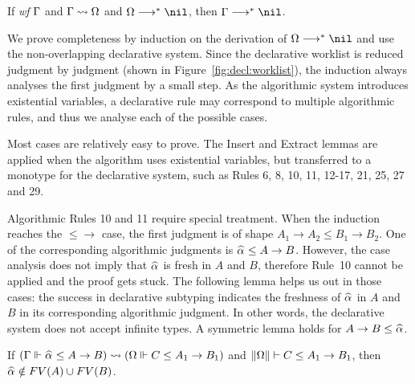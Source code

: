 \begin{theorem}[Completeness]
If \emph{wf }$\Gamma$ and $\Gamma\rightsquigarrow\Omega$ and $\Om\redto\nil$, then $\Gm \redto \nil$.
\label{thm:completeness}
\end{theorem}

We prove completeness by induction on the derivation of $\Om\redto\nil$
and use the non-overlapping declarative system.
Since the declarative worklist is reduced judgment by judgment
(shown in Figure~\ref{fig:decl:worklist}),
the induction always analyses the first judgment by a small step.
As the algorithmic system introduces existential variables,
a declarative rule may correspond to multiple algorithmic rules,
and thus we analyse each of the possible cases.

Most cases are relatively easy to prove.
The Insert and Extract lemmas are applied when the algorithm uses existential variables,
but transferred to a monotype for the declarative system,
such as Rules 6, 8, 10, 11, 12-17, 21, 25, 27 and 29.

Algorithmic Rules 10 and 11 require special treatment.
When the induction reaches the $\mathtt{{\le}{\to}}$ case,
the first judgment is of shape $A_1 \to A_2 \le B_1 \to B_2$.
One of the corresponding algorithmic judgments is $\al \le A \to B$.
However, the case analysis does not imply that $\al$ is fresh in $A$ and $B$,
therefore Rule~10 cannot be applied and the proof gets stuck.
The following lemma helps us out in those cases:
the success in declarative subtyping indicates the freshness of $\al$ in $A$ and $B$
in its corresponding algorithmic judgment.
In other words, the declarative system does not accept infinite types.
A symmetric lemma holds for $A\to B \le \al$.

\begin{lemma}\label{lem:prune_inst}
If $(\Gm \Vdash \al \le A \to B) \sto (\Om \Vdash C \le A_1 \to B_1)$ and
$\|\Omega\| \vdash C \le A_1 \to B_1$, then $\al\notin FV(A) \cup FV(B)$.
\end{lemma}

